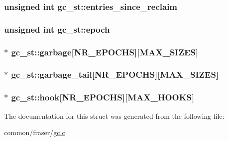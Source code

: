 \hypertarget{structgc__st_abdb3ffc1ba4e5d4250ad4ec03d8eff50}{
\subsubsection[{entries\-\_\-since\-\_\-reclaim}]{\setlength{\rightskip}{0pt plus 5cm}unsigned int gc\-\_\-st\-::entries\-\_\-since\-\_\-reclaim}}\label{structgc__st_abdb3ffc1ba4e5d4250ad4ec03d8eff50}
\hypertarget{structgc__st_aa9ad4f123ba3c959123e85406bfe149b}{
\subsubsection[{epoch}]{\setlength{\rightskip}{0pt plus 5cm}unsigned int gc\-\_\-st\-::epoch}}\label{structgc__st_aa9ad4f123ba3c959123e85406bfe149b}
\hypertarget{structgc__st_a9a4e8e2d1ad05d2683be3e43b01439e5}{
\subsubsection[{garbage}]{$\ast$ gc\-\_\-st\-::garbage\mbox{[}{\bf N\-R\-\_\-\-E\-P\-O\-C\-H\-S}\mbox{]}\mbox{[}{\bf M\-A\-X\-\_\-\-S\-I\-Z\-E\-S}\mbox{]}}}\label{structgc__st_a9a4e8e2d1ad05d2683be3e43b01439e5}
\hypertarget{structgc__st_ac442c1204915548c2f15be6de336a7f1}{
\subsubsection[{garbage\-\_\-tail}]{$\ast$ gc\-\_\-st\-::garbage\-\_\-tail\mbox{[}{\bf N\-R\-\_\-\-E\-P\-O\-C\-H\-S}\mbox{]}\mbox{[}{\bf M\-A\-X\-\_\-\-S\-I\-Z\-E\-S}\mbox{]}}}\label{structgc__st_ac442c1204915548c2f15be6de336a7f1}
\hypertarget{structgc__st_a7bbafe17b373d9a64f0cc1aaf4e2b9f2}{
\subsubsection[{hook}]{$\ast$ gc\-\_\-st\-::hook\mbox{[}{\bf N\-R\-\_\-\-E\-P\-O\-C\-H\-S}\mbox{]}\mbox{[}{\bf M\-A\-X\-\_\-\-H\-O\-O\-K\-S}\mbox{]}}}\label{structgc__st_a7bbafe17b373d9a64f0cc1aaf4e2b9f2}


The documentation for this struct was generated from the following file\-:\begin{DoxyCompactItemize}
\item 
common/fraser/\hyperlink{gc_8c}{gc.\-c}\end{DoxyCompactItemize}
